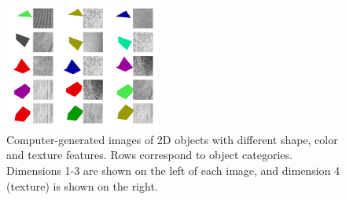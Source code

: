 \begin{figure}[t!]
    \begin{center}
        \includegraphics[width=0.45\textwidth]{figures/generated_images.pdf}
    \end{center}
    \caption{Computer-generated images of 2D objects with
    different shape, color and texture features. Rows correspond to object
    categories. Dimensions 1-3 are shown on the left of each image, and
    dimension 4 (texture) is shown on the right.}
    \label{fig:generated_images}
\end{figure}

